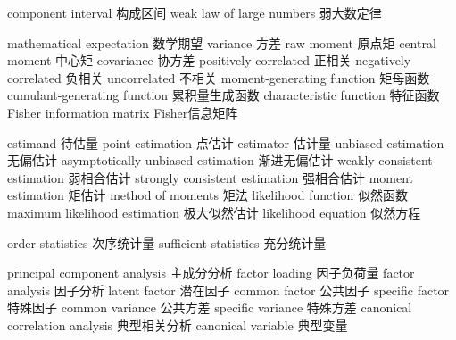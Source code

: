 {component interval} 
{构成区间}
{weak law of large numbers} 
{弱大数定律}


{mathematical expectation} 
{数学期望}
{variance} 
{方差}
{raw moment} 
{原点矩}
{central moment} 
{中心矩}
{covariance} 
{协方差}
{positively correlated} 
{正相关}
{negatively correlated} 
{负相关}
{uncorrelated} 
{不相关}
{moment-generating function} 
{矩母函数}
{cumulant-generating function} 
{累积量生成函数}
{characteristic function} 
{特征函数}
{Fisher information matrix} 
{Fisher信息矩阵}


{estimand} 
{待估量}
{point estimation} 
{点估计}
{estimator} 
{估计量}
{unbiased estimation} 
{无偏估计}
{asymptotically unbiased estimation} 
{渐进无偏估计}
{weakly consistent estimation} 
{弱相合估计}
{strongly consistent estimation} 
{强相合估计}
{moment estimation} 
{矩估计}
{method of moments} 
{矩法}
{likelihood function} 
{似然函数}
{maximum likelihood estimation} 
{极大似然估计}
{likelihood equation} 
{似然方程}

{order statistics} 
{次序统计量}
{sufficient statistics} 
{充分统计量}

{principal component analysis} 
{主成分分析}
{factor loading} 
{因子负荷量}
{factor analysis} 
{因子分析}
{latent factor} 
{潜在因子}
{common factor} 
{公共因子}
{specific factor} 
{特殊因子}
{common variance} 
{公共方差}
{specific variance} 
{特殊方差}
{canonical correlation analysis} 
{典型相关分析}
{canonical variable} 
{典型变量}

